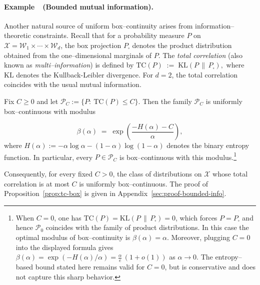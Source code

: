 \documentclass[arxiv]{colt2026}
\newcounter{examplectr}
\newcommand{\X}{\mathcal{X}}
\newcommand{\W}{\mathcal{W}}
\newcommand{\Pc}{\mathcal{P}}
\newcommand{\KL}{\mathrm{KL}}
\begin{document}
\paragraph{Example~\theexamplectr\ (Bounded mutual information).}
\label{ex:total-correlation}
Another natural source of uniform box--continuity arises from
information--theoretic constraints.
Recall that for a probability measure $P$ on
$\X=\W_1\times\cdots\times\W_d$, the box projection $P_{\square}$ denotes the
product distribution obtained from the one--dimensional marginals of $P$.
The \emph{total correlation} (also known as \emph{multi--information}) is defined by
\(\mathrm{TC}(P)\;:=\;\KL\!\left(P\,\middle\|\,P_{\square}\right),
\)
where \(\KL\) denotes the Kullback-Leibler divergence.
For $d=2$, the total correlation coincides with the usual mutual information.

\vspace{-0.5em}
\begin{proposition}
\label{prop:tc-box}
Fix $C\ge 0$ and let $\Pc_C := \{P:\ \mathrm{TC}(P)\le C\}$.
Then the family $\Pc_C$ is uniformly box--continuous with modulus

\vspace{-0.5em}
\[
\beta(\alpha)
\;=\;
\exp\!\left(\frac{-H(\alpha)-C}{\alpha}\right),
\]
where $H(\alpha) := -\alpha \log \alpha - (1-\alpha)\log(1-\alpha)$ denotes the binary entropy function.
In particular, every $P\in\Pc_C$ is box--continuous with this modulus.\footnote{When $C=0$, one has $\mathrm{TC}(P)=\KL(P\,\|\,P_{\square})=0$, which forces $P=P_{\square}$ and hence $\Pc_0$ coincides with the family of product distributions. In this case the optimal modulus of box--continuity is $\beta(\alpha)=\alpha$. Moreover, plugging $C=0$ into the displayed formula gives $\beta(\alpha)=\exp(-H(\alpha)/\alpha)=\tfrac{\alpha}{e}\,(1+o(1))$ as $\alpha\to 0$. The entropy--based bound stated here remains valid for $C=0$, but is conservative and does not capture this sharp behavior.}
\end{proposition}

\vspace{-0.5em}
Consequently, for every fixed $C>0$, the class of distributions on $\X$ whose
total correlation is at most $C$ is uniformly box–continuous.
The proof of Proposition~\ref{prop:tc-box} is given in Appendix~\ref{sec:proof-bounded-info}.

\end{document}
